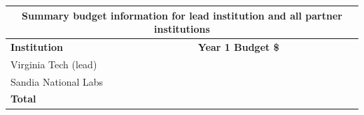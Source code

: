 \begin{table}[h]
    \begin{tabular}{|l|l|}
    \hline
    \multicolumn{2}{|c|}{\textbf{Summary budget information for lead institution and all partner institutions}}    \\ \hline
    \textbf{Institution} & \textbf{Year 1 Budget \$} \\ \hline
        Virginia Tech (lead) & \todo{} \\ \hline
        Sandia National Labs &  \todo{} \\ \hline
    \textbf{Total} & \todo{} \\ \hline
    \end{tabular}
    \label{tab:my_label}
\end{table}
